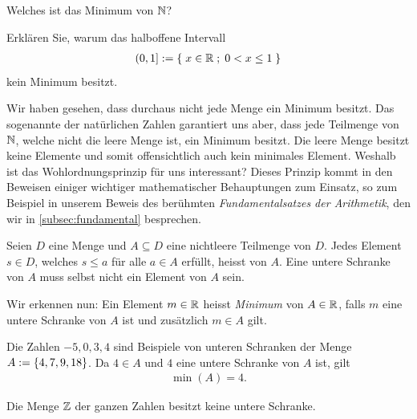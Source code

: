 \begin{myexercise}\label{myexercise:0267}
	\begin{aenum}
		\item Welches ist das Minimum von $\mathbb{N}$?
		\item Erklären Sie, warum das halboffene Intervall
		\begin{align*}
			\left(0, 1\right] := \left\{\;x\in\mathbb{R} \; ; \; 0<x\leq 1 \;\right\}
		\end{align*}
		kein Minimum besitzt.
	\end{aenum}
\end{myexercise}
\noindent
Wir haben gesehen, dass durchaus nicht jede Menge ein Minimum besitzt. Das sogenannte  der natürlichen Zahlen garantiert uns aber, dass jede Teilmenge von $\mathbb{N}$, welche nicht die leere Menge ist, ein Minimum besitzt. Die leere Menge besitzt keine Elemente und somit offensichtlich auch kein minimales Element. Weshalb ist das Wohlordnungsprinzip für uns interessant? Dieses Prinzip kommt in den Beweisen einiger wichtiger mathematischer Behauptungen zum Einsatz, so zum Beispiel in unserem Beweis des berühmten \textit{Fundamentalsatzes der Arithmetik}, den wir in \cref{subsec:fundamental} besprechen.

\begin{mydefinition}\label{mydefinition:schranke}
Seien $D$ eine Menge und $A\subseteq D$ eine nichtleere Teilmenge von $D$. Jedes Element $s\in D$, welches $s \leq a$ für alle $a\in A$ erfüllt, heisst  von $A$. Eine untere Schranke von $A$ muss selbst nicht ein Element von $A$ sein.
\end{mydefinition}
\noindent
Wir erkennen nun: Ein Element $m\in\mathbb{R}$ heisst \textit{Minimum} von $A\in\mathbb{R}$, falls $m$ eine untere Schranke von $A$ ist und zusätzlich $m\in A$ gilt.

\begin{myexample}
\begin{aenum}
	\item Die Zahlen $-5, 0, 3, 4$ sind Beispiele von unteren Schranken der Menge $A:=\left\{4,7,9,18\right\}$.
	Da $4\in A$ und $4$ eine untere Schranke von $A$ ist, gilt
	\begin{align*}
		\min(A) = 4.
	\end{align*}
	\item Die Menge $\mathbb{Z}$ der ganzen Zahlen besitzt keine untere Schranke.
\end{aenum}
\end{myexample}


